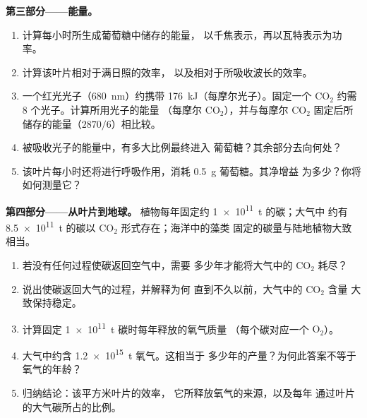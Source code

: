 \begin{problem}
\medskip
\noindent\textbf{第三部分——能量。}
\begin{enumerate}[resume]
  \item 计算每小时所生成葡萄糖中储存的能量，
        以千焦表示，再以瓦特表示为功率。
  \item 计算该叶片相对于满日照的效率，
        以及相对于所吸收波长的效率。
  \item 一个红光光子（\qty{680}{nm}）约携带
        \qty{176}{kJ}（每摩尔光子）。固定一个 $\mathrm{CO_2}$
        约需 8 个光子。计算所用光子的能量
        （每摩尔 $\mathrm{CO_2}$），并与每摩尔 $\mathrm{CO_2}$
        固定后所储存的能量（$2870/6$）相比较。
  \item 被吸收光子的能量中，有多大比例最终进入
        葡萄糖？其余部分去向何处？
  \item 该叶片每小时还将进行呼吸作用，消耗 \qty{0.5}{g} 葡萄糖。其净增益
        为多少？你将如何测量它？
\end{enumerate}

\medskip
\noindent\textbf{第四部分——从叶片到地球。}
植物每年固定约 \qty{1e11}{t} 的碳；大气中
约有 \qty{8.5e11}{t} 的碳以 $\mathrm{CO_2}$ 形式存在；海洋中的藻类
固定的碳量与陆地植物大致相当。
\begin{enumerate}[resume]
  \item 若没有任何过程使碳返回空气中，需要
        多少年才能将大气中的 $\mathrm{CO_2}$ 耗尽？
  \item 说出使碳返回大气的过程，并解释为何
        直到不久以前，大气中的 $\mathrm{CO_2}$ 含量
        大致保持稳定。
  \item 计算固定 \qty{1e11}{t} 碳时每年释放的氧气质量
        （每个碳对应一个 $\mathrm{O_2}$）。
  \item 大气中约含 \qty{1.2e15}{t} 氧气。这相当于
        多少年的产量？为何此答案不等于
        氧气的年龄？
  \item 归纳结论：该平方米叶片的效率，
        它所释放氧气的来源，以及每年
        通过叶片的大气碳所占的比例。
\end{enumerate}
\end{problem}
